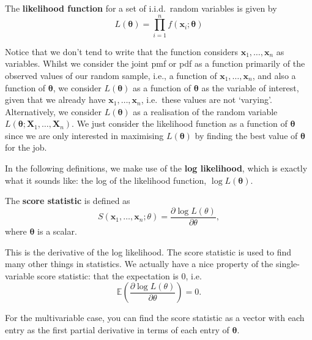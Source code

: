 \begin{definition}\label{defn:likelihood func}
    The \textbf{likelihood function} for a set of i.i.d.\ random variables is given by
    \begin{equation}\label{eq:likelihood func}
        L(\bm{\theta}) = \prod_{i=1}^n f(\bm{x}_i;\bm{\theta})
    \end{equation}
\end{definition}

Notice that we don't tend to write that the function considers \(\bm{x}_1,\ldots,\bm{x}_n\) as variables. 
Whilst we consider the joint pmf or pdf as a function primarily of the observed values of our random sample, 
i.e., a function of \(\bm{x}_1,\ldots,\bm{x}_n\), and also a function of \(\bm{\theta}\), 
we consider \(L(\bm{\theta})\) as a function of \(\bm{\theta}\) as the variable of interest, 
given that we already have \(\bm{x}_1,\ldots,\bm{x}_n\), i.e.\ these values are not `varying'.
Alternatively, we consider \(L(\bm{\theta})\) as a realisation of the random variable \(L(\bm{\theta};\bm{X}_1,\ldots,\bm{X}_n)\).
We just consider the likelihood function as a function of \(\bm{\theta}\) since we are only interested in maximising \(L(\bm{\theta})\) by finding the best value of \(\bm{\theta}\) for the job. 

\bigskip

In the following definitions, we make use of the \textbf{log likelihood}, which is exactly what it sounds like: the log of the likelihood function, \(\log L(\bm{\theta})\). 

\begin{definition}\label{defn:score stat}
    The \textbf{score statistic} is defined as 
    \begin{equation}\label{eq:score stat}
        S(\bm{x}_1,\ldots,\bm{x}_n;\theta) = \frac{\partial \log L(\theta)}{\partial \theta},
    \end{equation}
    where \(\bm{\theta}\) is a scalar. 
\end{definition}

This is the derivative of the log likelihood. 
The score statistic is used to find many other things in statistics. 
We actually have a nice property of the single-variable score statistic: that the expectation is \(0\), i.e. \[\mathbb{E}\left(\frac{\partial \log L(\theta)}{\partial \theta}\right) = 0.\]

\medskip 

For the multivariable case, you can find the score statistic as a vector with each entry as the first partial derivative in terms of each entry of \(\bm{\theta}\). 

